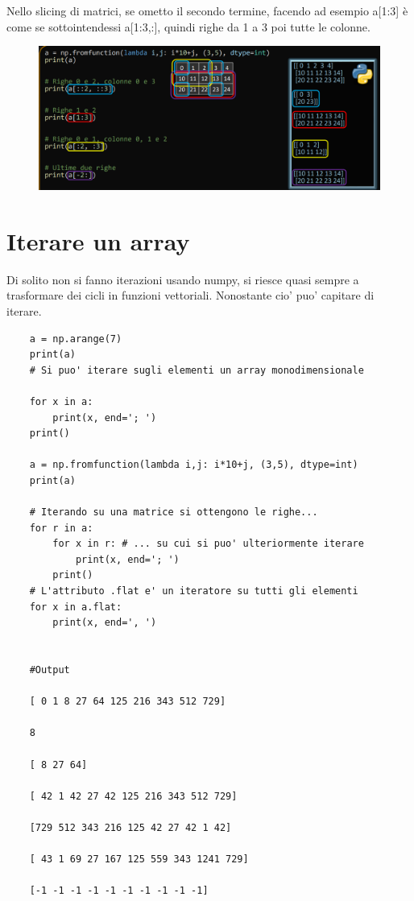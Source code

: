 Nello slicing di matrici, se ometto il secondo termine, facendo ad esempio a[1:3] è come se sottointendessi a[1:3,:], quindi righe da 1 a 3 poi tutte le colonne.

\begin{figure}[htt]
	\includegraphics[width=500pt]{./immagini/slicing_array_multidimensionali1.png}
	\label{img:slicing_array_multidimensionali1}
\end{figure}

\newpage

\section{Iterare un array}

Di solito non si fanno iterazioni usando numpy, si riesce quasi sempre a trasformare dei cicli in funzioni vettoriali. Nonostante cio' puo' capitare di iterare.

\begin{lstlisting}
	a = np.arange(7)
	print(a)
	# Si puo' iterare sugli elementi un array monodimensionale

	for x in a:
		print(x, end='; ')
	print()
	
	a = np.fromfunction(lambda i,j: i*10+j, (3,5), dtype=int)
	print(a)
	
	# Iterando su una matrice si ottengono le righe...
	for r in a:
		for x in r: # ... su cui si puo' ulteriormente iterare
			print(x, end='; ')
		print()
	# L'attributo .flat e' un iteratore su tutti gli elementi
	for x in a.flat:
		print(x, end=', ')

	
	#Output
	
	[ 0 1 8 27 64 125 216 343 512 729]
	
	8
	
	[ 8 27 64]
	
	[ 42 1 42 27 42 125 216 343 512 729]
	
	[729 512 343 216 125 42 27 42 1 42]
	
	[ 43 1 69 27 167 125 559 343 1241 729]
	
	[-1 -1 -1 -1 -1 -1 -1 -1 -1 -1]
\end{lstlisting}

